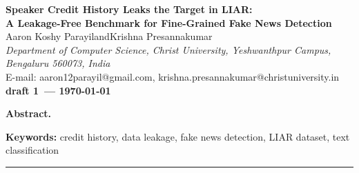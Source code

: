 \documentclass[11pt,oneside,a4paper]{article}
\newcommand{\draftversion}{draft 1}
\begin{document}
\linenumbers

\begin{center}
{\large\bfseries Speaker Credit History Leaks the Target in LIAR:\\[3pt]
 A Leakage-Free Benchmark for Fine-Grained Fake News Detection}\\[14pt]
{\normalsize Aaron Koshy Parayil\quad and\quad Krishna Presannakumar}\\[5pt]
{\small\itshape Department of Computer Science, Christ University,
 Yeshwanthpur Campus, Bengaluru 560073, India}\\[3pt]
{\small E-mail: aaron12parayil@gmail.com,
 krishna.presannakumar@christuniversity.in}\\[6pt]
{\footnotesize\bfseries \draftversion\ --- \today}
\end{center}


\vspace{10pt}
{\singlespacing\small
\noindent\textbf{Abstract.}


\vspace{6pt}
\noindent\textbf{Keywords:} credit history, data leakage, fake news detection,
LIAR dataset, text classification
}

\vspace{10pt}
\hrule
\vspace{6pt}




\end{document}

